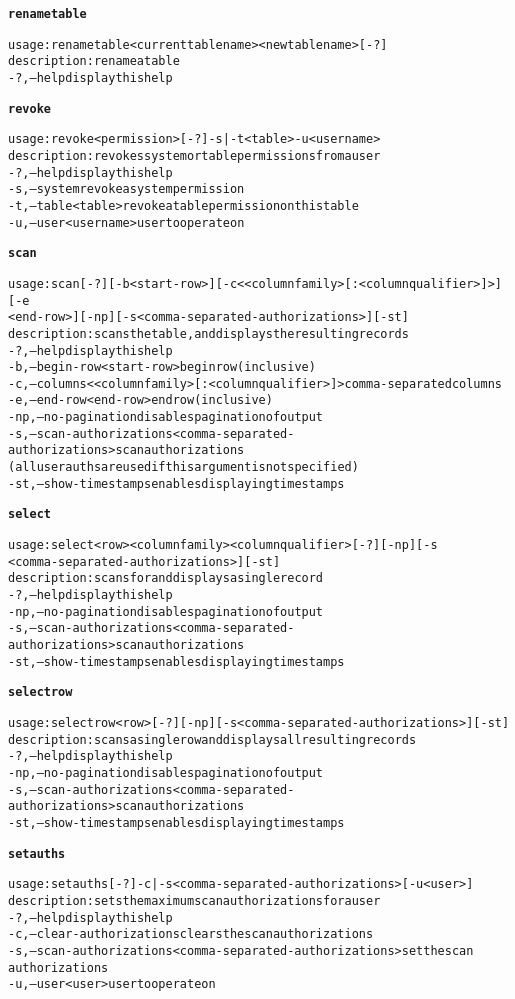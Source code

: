 \begin{alltt}
\textbf{renametable}

    usage: renametable <current table name> <new table name> [-?]
    description: rename a table
      -?,--help  display this help

\textbf{revoke}

    usage: revoke <permission> [-?] -s | -t <table>  -u <username>
    description: revokes system or table permissions from a user
      -?,--help  display this help
      -s,--system  revoke a system permission
      -t,--table <table>  revoke a table permission on this table
      -u,--user <username>	user to operate on

\textbf{scan}

    usage: scan [-?] [-b <start-row>] [-c <{<columnfamily>[:<columnqualifier>]}>] [-e
    	      <end-row>] [-np] [-s <comma-separated-authorizations>] [-st]
    description: scans the table, and displays the resulting records
      -?,--help  display this help
      -b,--begin-row <start-row>  begin row (inclusive)
      -c,--columns <{<columnfamily>[:<columnqualifier>]}>  comma-separated columns
      -e,--end-row <end-row>  end row (inclusive)
      -np,--no-pagination  disables pagination of output
      -s,--scan-authorizations <comma-separated-authorizations>  scan authorizations
    	      (all user auths are used if this argument is not specified)
      -st,--show-timestamps  enables displaying timestamps

\textbf{select}

    usage: select <row> <columnfamily> <columnqualifier> [-?] [-np] [-s
    	      <comma-separated-authorizations>] [-st]
    description: scans for and displays a single record
      -?,--help  display this help
      -np,--no-pagination  disables pagination of output
      -s,--scan-authorizations <comma-separated-authorizations>  scan authorizations
      -st,--show-timestamps  enables displaying timestamps

\textbf{selectrow}

    usage: selectrow <row> [-?] [-np] [-s <comma-separated-authorizations>] [-st]
    description: scans a single row and displays all resulting records
      -?,--help  display this help
      -np,--no-pagination  disables pagination of output
      -s,--scan-authorizations <comma-separated-authorizations>  scan authorizations
      -st,--show-timestamps  enables displaying timestamps

\textbf{setauths}

    usage: setauths [-?] -c | -s <comma-separated-authorizations>  [-u <user>]
    description: sets the maximum scan authorizations for a user
      -?,--help  display this help
      -c,--clear-authorizations  clears the scan authorizations
      -s,--scan-authorizations <comma-separated-authorizations>  set the scan
    	      authorizations
      -u,--user <user>  user to operate on


\end{alltt}
